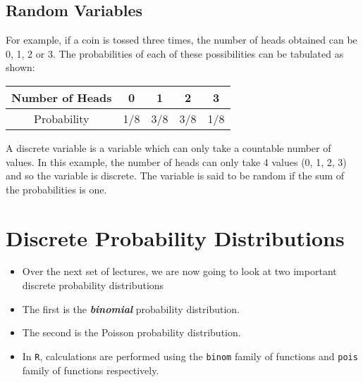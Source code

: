 \documentclass[]{report}
\begin{document}
\subsection{Random Variables}
For example, if a coin is tossed three times, the number of heads obtained can be 0, 1, 2 or 3. The probabilities of each of these possibilities can be tabulated as shown:

\begin{tabular}{|c|c|c|c|c|}
\hline Number of Heads & 0 & 1 & 2 & 3 \\ 
\hline Probability & 1/8  & 3/8  & 3/8 & 1/8 \\ 
\hline 
\end{tabular} 

A discrete variable is a variable which can only take a countable number of values. In this example, the number of heads can only take 4 values (0, 1, 2, 3) and so the variable is discrete. The variable is said to be random if the sum of the probabilities is one. 











\section{Discrete Probability Distributions}

\begin{itemize}

\item  Over the next set of lectures, we are now going to look at two important discrete probability distributions

\item  The first is the \textbf{\emph{binomial}} probability distribution.

\item  The second is the Poisson probability distribution.

\item  In \texttt{R}, calculations are performed using the \texttt{binom} family of functions and \texttt{pois} family of functions respectively.
\end{itemize}
\end{document}
